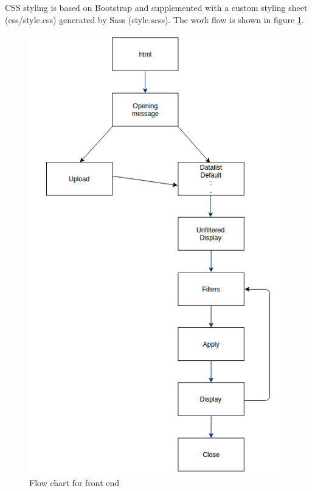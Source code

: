 \documentclass{article}
\begin{document}
CSS styling is based on Bootstrap and supplemented with a custom styling
sheet (css/style.css) generated by Sass (style.scss). The work flow is shown in
figure \ref{figure:6}.

\begin{figure}[h]
	\centering
	\includegraphics[scale=0.5]{frontflow}
	\caption{Flow chart for front end}
	\label{figure:6}
\end{figure}
\end{document}
